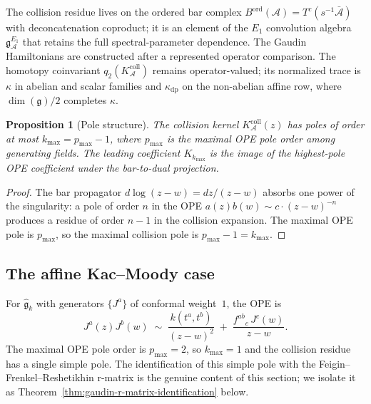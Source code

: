 \documentclass[11pt]{article}
\theoremstyle{plain}
\newtheorem{proposition}[theorem]{Proposition}
\theoremstyle{definition}
\theoremstyle{remark}
\newcommand{\fg}{\mathfrak{g}}
\newcommand{\cA}{\mathcal{A}}
\numberwithin{equation}{section}
\begin{document}
The collision residue lives on the ordered bar complex
$B^{\mathrm{ord}}(\cA) = T^c(s^{-1}\bar{\cA})$ with deconcatenation
coproduct; it is an element of the $E_1$ convolution algebra
$\mathfrak{g}^{E_1}_\cA$ that retains the full spectral-parameter
dependence. The Gaudin Hamiltonians are constructed after a represented
operator comparison. The homotopy coinvariant
$q_2(K_\cA^{\mathrm{coll}})$ remains operator-valued; its normalized
trace is $\kappa$ in abelian and scalar families and
$\kappa_{\mathrm{dp}}$ on the non-abelian affine row, where
$\dim(\fg)/2$ completes $\kappa$.

\begin{proposition}[Pole structure]\label{prop:pole-structure}
The collision kernel $K_\cA^{\mathrm{coll}}(z)$ has poles of order at most
$k_{\max} = p_{\max} - 1$, where $p_{\max}$ is the maximal OPE pole
order among generating fields. The leading coefficient $K_{k_{\max}}$
is the image of the highest-pole OPE coefficient under the bar-to-dual
projection.
\end{proposition}

\begin{proof}
The bar propagator $d\log(z-w) = dz/(z-w)$ absorbs one power of the
singularity: a pole of order $n$ in the OPE
$a(z)b(w) \sim c \cdot (z-w)^{-n}$ produces a residue of order
$n-1$ in the collision expansion. The maximal OPE pole is
$p_{\max}$, so the maximal collision pole is $p_{\max} - 1 =
k_{\max}$.
\end{proof}

\subsection{The affine Kac--Moody case}

For $\widehat{\fg}_k$ with generators $\{J^a\}$ of conformal
weight~$1$, the OPE is
\begin{equation}\label{eq:km-ope}
 J^a(z) J^b(w) \;\sim\;
 \frac{k(t^a, t^b)}{(z-w)^2}
 \;+\;
 \frac{f^{ab}{}_c \, J^c(w)}{z-w}.
\end{equation}
The maximal OPE pole order is $p_{\max} = 2$, so $k_{\max} = 1$ and
the collision residue has a single simple pole. The identification
of this simple pole with the Feigin--Frenkel--Reshetikhin
r-matrix is the genuine content of this section; we isolate it as
Theorem~\ref{thm:gaudin-r-matrix-identification} below.
\end{document}
